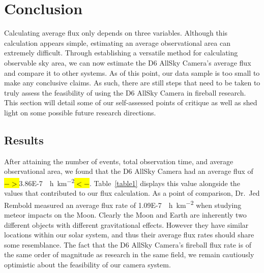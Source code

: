 

\chapter{Conclusion}

Calculating average flux only depends on three variables. 
Although this calculation appears simple, estimating an average observational area can extremely difficult. 
Through establishing a versatile method for calculating observable sky area, we can now estimate the D6 AllSky Camera's average flux and compare it to other systems.
As of this point, our data sample is too small to make any conclusive claims.  
As such, there are still steps that need to be taken to truly assess the feasibility of using the D6 AllSky Camera in fireball research.  
This section will detail some of our self-assessed points of critique as well as shed light on some possible future research directions.

\section{Results}
After attaining the number of events, total observation time, and average observational area, we found that the D6 AllSky Camera had an average flux of \hl{$->$}\SI{3.86E-7}{\per\hour\per\square\kilo\meter}\hl{$<-$}.
Table~\ref{table1} displays this value alongside the values that contributed to our flux calculation. 
As a point of comparison, Dr.~Jed Rembold measured an average flux rate of \SI{1.09E-7}{\per\hour\per\square\kilo\meter} when studying meteor impacts on the Moon. 
Clearly the Moon and Earth are inherently two different objects with different gravitational effects.
However they have similar locations within our solar system, and thus their average flux rates should share some resemblance.
The fact that the D6 AllSky Camera's fireball flux rate is of the same order of magnitude as research in the same field, we remain cautiously optimistic about the feasibility of our camera system.



